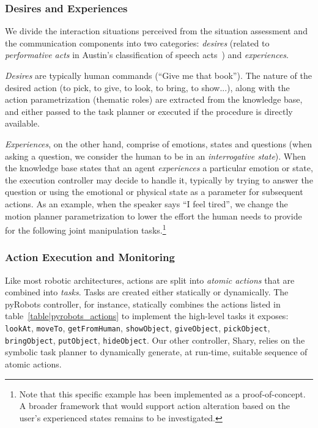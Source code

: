 \documentclass[preprint,3p,times]{elsarticle}
\begin{document}
\subsubsection{Desires and Experiences}
\label{sect:desires}

We divide the interaction situations perceived from the situation assessment and
the communication components into two categories: \emph{desires} (related to
\emph{performative acts} in Austin's classification of speech
acts~\cite{Austin1962}) and \emph{experiences}.

\emph{Desires} are typically human commands (``Give me that book''). The nature of
the desired action (to pick, to give, to look, to bring, to show...), along with the action
parametrization (thematic roles) are extracted from the knowledge base, and
either passed to the task planner or executed if the procedure is directly
available.

\emph{Experiences}, on the other hand, comprise of emotions, states and
questions (when asking a question, we consider the human to be in an
\emph{interrogative state}). When the knowledge base states that an agent
\emph{experiences} a particular emotion or state, the execution controller may
decide to handle it, typically by trying to answer the question or using the
emotional or physical state as a parameter for subsequent actions. As an
example, when the speaker says ``I feel tired'', we change the motion planner
parametrization to lower the effort the human needs to provide for the following
joint manipulation tasks.\footnote{Note that this specific example has been
implemented as a proof-of-concept. A broader framework that would support
action alteration based on the user's experienced states remains to be investigated.}

\subsubsection{Action Execution and Monitoring}\label{sec:action}

Like most robotic architectures, actions are split into \emph{atomic actions}
that are combined into \emph{tasks}. Tasks are created either statically or dynamically.
The {\sc pyRobots} controller, for instance, statically combines the actions listed in
table~\ref{table|pyrobots_actions} to implement the high-level tasks it exposes: {\tt
lookAt}, {\tt moveTo}, {\tt getFromHuman}, {\tt showObject}, {\tt giveObject},
{\tt pickObject}, {\tt bringObject}, {\tt putObject}, {\tt hideObject}.
Our other controller, {\sc Shary}, relies on the symbolic task planner to
dynamically generate, at run-time, suitable sequence of atomic actions.
\end{document}
